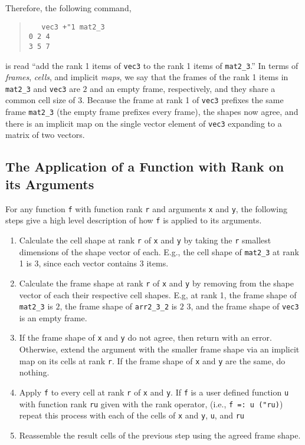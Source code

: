 Therefore, the following command, 

\begin{quote}
\begin{singlespacing}
\begin{small}
\begin{verbatim}
   vec3 +"1 mat2_3
0 2 4
3 5 7
\end{verbatim}
\end{small}
\end{singlespacing}
\end{quote}

\noindent is read ``add the rank 1 items of \texttt{vec3} to the rank 1 items of \texttt{mat2\_3}.''
In terms of \textit{frames}, \textit{cells}, and implicit \textit{maps}, we say that
the frames of the rank 1 items in \texttt{mat2\_3} and \texttt{vec3} are $2$ and an empty frame, respectively, and they share a common cell size of $3$.
Because the frame at rank 1 of \texttt{vec3} prefixes the same frame \texttt{mat2\_3} (the empty frame prefixes every frame), 
the shapes now agree, and there is an implicit map on the single vector element of \texttt{vec3} expanding to a matrix of two vectors.

\subsection{The Application of a Function with Rank on its Arguments}
\label{fridp}
For any function \texttt{f} with function rank \texttt{r} and arguments \texttt{x} and \texttt{y}, 
the following steps give a high level description of how \texttt{f} is applied to its arguments\cite{rankanduni}.
\begin{enumerate}
	\item Calculate the cell shape at rank \texttt{r} of \texttt{x} and \texttt{y} 
		by taking the \texttt{r} smallest dimensions of the shape vector of each.
		E.g., the cell shape of \texttt{mat2\_3} at rank 1 is 3, since each vector contains 3 items.
	\item Calculate the frame shape at rank \texttt{r} of \texttt{x} and \texttt{y} 
		by removing from the shape vector of each their respective cell shapes.
		E.g, at rank 1, the frame shape of \texttt{mat2\_3} is $2$,
		the frame shape of \texttt{arr2\_3\_2} is $2$ $3$, 
		and the frame shape of \texttt{vec3} is an empty frame.
	\item If the frame shape of \texttt{x} and \texttt{y} do not agree, then return with an error.
		Otherwise, extend the argument with the smaller frame shape via an implicit map on its cells at rank \texttt{r}.
		If the frame shape of \texttt{x} and \texttt{y} are the same, do nothing.
	\item \label{dataparstep}Apply \texttt{f} to every cell at rank \texttt{r} of \texttt{x} and \texttt{y}.
		If \texttt{f} is a user defined function \texttt{u} with function rank \texttt{ru} given with the rank operator,
		(i.e., \texttt{f =: u ("ru)})
		repeat this process with each of the cells of \texttt{x} and \texttt{y}, \texttt{u}, and \texttt{ru}
	\item Reassemble the result cells of the previous step using the agreed frame shape.
\end{enumerate}

